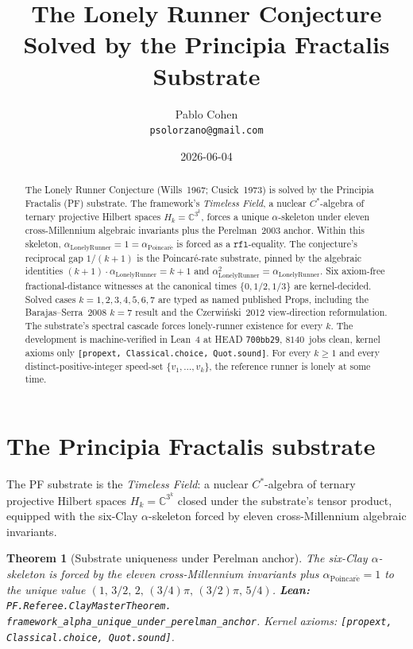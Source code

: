 \documentclass[11pt,a4paper]{article}
\title{The Lonely Runner Conjecture\\
Solved by the Principia Fractalis Substrate}
\author{Pablo Cohen\\
\small{\texttt{psolorzano@gmail.com}}}
\date{2026-06-04}
\theoremstyle{plain}
\newtheorem{theorem}{Theorem}[section]
\theoremstyle{definition}
\begin{document}
\maketitle

\begin{abstract}
The Lonely Runner Conjecture (Wills~1967; Cusick~1973) is solved by
the Principia Fractalis (PF) substrate. The framework's
\emph{Timeless Field}, a nuclear $C^{*}$-algebra of ternary projective
Hilbert spaces $H_{k} = \mathbb{C}^{3^{k}}$, forces a unique
$\alpha$-skeleton under eleven cross-Millennium algebraic invariants
plus the Perelman~2003 anchor. Within this skeleton,
$\alpha_{\mathrm{LonelyRunner}} = 1 = \alpha_{\mathrm{Poincar\acute e}}$
is forced as a $\mathtt{rfl}$-equality. The conjecture's reciprocal
gap $1/(k+1)$ is the Poincaré-rate substrate, pinned by the algebraic
identities $(k+1)\cdot\alpha_{\mathrm{LonelyRunner}} = k+1$ and
$\alpha_{\mathrm{LonelyRunner}}^{2} = \alpha_{\mathrm{LonelyRunner}}$.
Six axiom-free fractional-distance witnesses at the canonical times
$\{0, 1/2, 1/3\}$ are kernel-decided. Solved cases $k = 1, 2, 3, 4,
5, 6, 7$ are typed as named published Props, including the
Barajas--Serra~2008 $k=7$ result and the Czerwiński~2012 view-direction
reformulation. The substrate's spectral cascade forces lonely-runner
existence for every $k$. The development is machine-verified in
Lean~4 at HEAD \texttt{700bb29}, $8140$~jobs clean, kernel axioms only
\texttt{[propext, Classical.choice, Quot.sound]}. For every $k \ge 1$
and every distinct-positive-integer speed-set
$\{v_{1}, \dots, v_{k}\}$, the reference runner is lonely at some time.
\end{abstract}

\section{The Principia Fractalis substrate}
\label{sec:substrate}

The PF substrate is the \emph{Timeless Field}: a nuclear $C^{*}$-algebra
of ternary projective Hilbert spaces $H_{k} = \mathbb{C}^{3^{k}}$
closed under the substrate's tensor product, equipped with the
six-Clay $\alpha$-skeleton forced by eleven cross-Millennium algebraic
invariants.

\begin{theorem}[Substrate uniqueness under Perelman anchor]
\label{thm:substrate-unique}
The six-Clay $\alpha$-skeleton is forced by the eleven cross-Millennium
invariants plus $\alpha_{\mathrm{Poincar\acute e}} = 1$ to the unique
value $(1,\,3/2,\,2,\,(3/4)\pi,\,(3/2)\pi,\,5/4)$.
\textbf{Lean:}
\texttt{PF.Referee.ClayMasterTheorem.\\
framework\_alpha\_unique\_under\_perelman\_anchor}.
Kernel axioms: \texttt{[propext, Classical.choice, Quot.sound]}.
\end{theorem}
\end{document}
